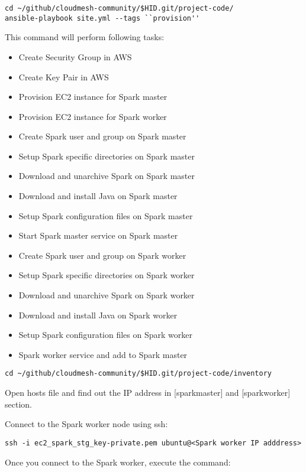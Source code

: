 \begin{verbatim}
cd ~/github/cloudmesh-community/$HID.git/project-code/
ansible-playbook site.yml --tags ``provision''
\end{verbatim}

This command will perform following tasks:

\begin{itemize}
	\item Create Security Group in AWS
	\item Create Key Pair in AWS
	\item Provision EC2 instance for Spark master
	\item Provision EC2 instance for Spark worker
	\item Create Spark user and group on Spark master
	\item Setup Spark specific directories on Spark master
	\item Download and unarchive Spark on Spark master
	\item Download and install Java on Spark master
	\item Setup Spark configuration files on Spark master
	\item Start Spark master service on Spark master
	\item Create Spark user and group on Spark worker
	\item Setup Spark specific directories on Spark worker
	\item Download and unarchive Spark  on Spark worker
	\item Download and install Java  on Spark worker
	\item Setup Spark configuration files on Spark worker
	\item Spark worker service and add to Spark master	
\end{itemize}

\begin{verbatim}
cd ~/github/cloudmesh-community/$HID.git/project-code/inventory
\end{verbatim}

Open hosts file and find out the IP address in [sparkmaster] and [sparkworker] section.

Connect to the Spark worker node using ssh:

\begin{verbatim}
ssh -i ec2_spark_stg_key-private.pem ubuntu@<Spark worker IP adddress>
\end{verbatim}

Once you connect to the Spark worker, execute the command:

